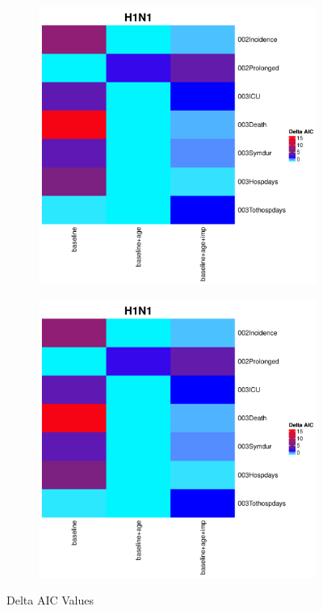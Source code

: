 \documentclass[12pt,twoside]{article}
\begin{document}
    \begin{figure}[h]
        \centering
        \begin{subfigure}{.475\textwidth}
            \includegraphics[width=\textwidth, page=1]{AIC_summary}
        \end{subfigure}\hfill
                \begin{subfigure}{.475\textwidth}
            \includegraphics[width=\textwidth, page=2]{AIC_summary}
        \end{subfigure}\hfill
        \caption[Network]{Delta AIC Values}
        \end{figure}
        
\end{document}
